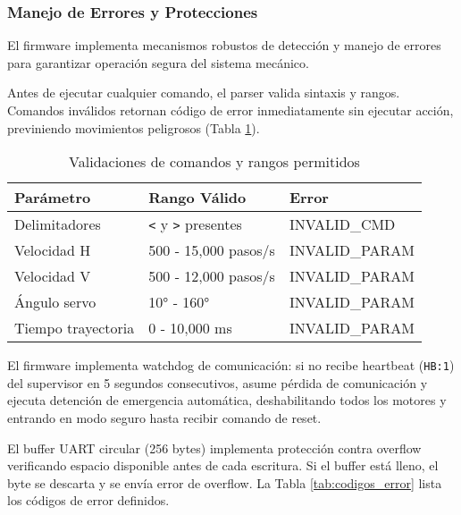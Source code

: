 \subsubsection{Manejo de Errores y Protecciones}

El firmware implementa mecanismos robustos de detección y manejo de errores para garantizar operación segura del sistema mecánico.

Antes de ejecutar cualquier comando, el parser valida sintaxis y rangos. Comandos inválidos retornan código de error inmediatamente sin ejecutar acción, previniendo movimientos peligrosos (Tabla \ref{tab:validacion_comandos}).

\begin{table}[H]
\centering
\small
\begin{tabular}{|l|l|l|}
\hline
\textbf{Parámetro} & \textbf{Rango Válido} & \textbf{Error} \\
\hline
Delimitadores & \texttt{<} y \texttt{>} presentes & INVALID\_CMD \\
\hline
Velocidad H & 500 - 15,000 pasos/s & INVALID\_PARAM \\
\hline
Velocidad V & 500 - 12,000 pasos/s & INVALID\_PARAM \\
\hline
Ángulo servo & 10° - 160° & INVALID\_PARAM \\
\hline
Tiempo trayectoria & 0 - 10,000 ms & INVALID\_PARAM \\
\hline
\end{tabular}
\caption{Validaciones de comandos y rangos permitidos}
\label{tab:validacion_comandos}
\end{table}

El firmware implementa watchdog de comunicación: si no recibe heartbeat (\texttt{HB:1}) del supervisor en 5 segundos consecutivos, asume pérdida de comunicación y ejecuta detención de emergencia automática, deshabilitando todos los motores y entrando en modo seguro hasta recibir comando de reset.

El buffer UART circular (256 bytes) implementa protección contra overflow verificando espacio disponible antes de cada escritura. Si el buffer está lleno, el byte se descarta y se envía error de overflow. La Tabla \ref{tab:codigos_error} lista los códigos de error definidos.


